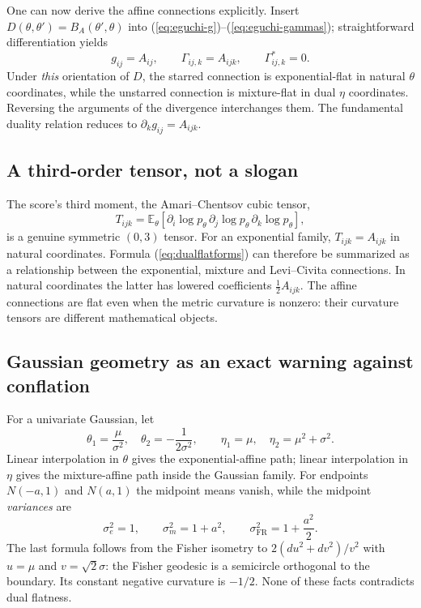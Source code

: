 \documentclass[11pt]{article}
\theoremstyle{definition}\newtheorem{definition}[theorem]{Definition}\newtheorem{exercise}{Problem}[section]
\newcommand{\EE}{\mathbb E}\newcommand{\RR}{\mathbb R}
\begin{document}
One can now derive the affine connections explicitly. Insert $D(\theta,\theta')=B_A(\theta',\theta)$ into (\ref{eq:eguchi-g})--(\ref{eq:eguchi-gammas}); straightforward differentiation yields
\begin{equation}\label{eq:dualflatforms}
 g_{ij}=A_{ij},\qquad \Gamma_{ij,k}=A_{ijk},\qquad \Gamma^*_{ij,k}=0.
\end{equation}
Under \emph{this} orientation of $D$, the starred connection is exponential-flat in natural $\theta$ coordinates, while the unstarred connection is mixture-flat in dual $\eta$ coordinates. Reversing the arguments of the divergence interchanges them. The fundamental duality relation reduces to $\partial_k g_{ij}=A_{ijk}$.

\subsection{A third-order tensor, not a slogan}

The score's third moment, the Amari--Chentsov cubic tensor,
\[
 T_{ijk}=\EE_\theta[\partial_i\log p_\theta\,\partial_j\log p_\theta\,\partial_k\log p_\theta],
\]
is a genuine symmetric $(0,3)$ tensor. For an exponential family, $T_{ijk}=A_{ijk}$ in natural coordinates. Formula (\ref{eq:dualflatforms}) can therefore be summarized as a relationship between the exponential, mixture and Levi--Civita connections. In natural coordinates the latter has lowered coefficients $\tfrac12 A_{ijk}$. The affine connections are flat even when the metric curvature is nonzero: their curvature tensors are different mathematical objects.

\subsection{Gaussian geometry as an exact warning against conflation}

For a univariate Gaussian, let
\[
\theta_1=\frac{\mu}{\sigma^2},\quad \theta_2=-\frac1{2\sigma^2},\qquad
\eta_1=\mu,\quad\eta_2=\mu^2+\sigma^2.
\]
Linear interpolation in $\theta$ gives the exponential-affine path; linear interpolation in $\eta$ gives the mixture-affine path inside the Gaussian family. For endpoints $N(-a,1)$ and $N(a,1)$ the midpoint means vanish, while the midpoint \emph{variances} are
\[
 \sigma_{e}^2=1,\qquad \sigma_{m}^2=1+a^2,\qquad
 \sigma_{\mathrm{FR}}^2=1+\frac{a^2}{2}.
\]
The last formula follows from the Fisher isometry to $2(du^2+dv^2)/v^2$ with $u=\mu$ and $v=\sqrt2\sigma$: the Fisher geodesic is a semicircle orthogonal to the boundary. Its constant negative curvature is $-1/2$. None of these facts contradicts dual flatness.
\end{document}
